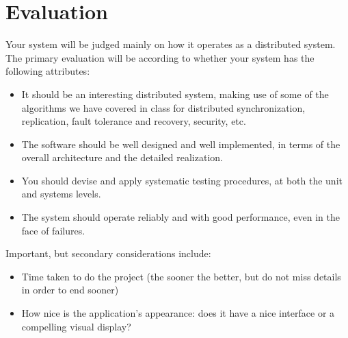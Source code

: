 \documentclass{memoir}
\begin{document}
\chapter*{Evaluation}
Your system will be judged mainly on how it operates as a distributed system. The primary evaluation will be according to whether your system has the following attributes:
\begin{itemize}
\item  It should be an interesting distributed system, making use of some of the algorithms we have covered in class for distributed synchronization, replication, fault tolerance and recovery, security, etc.
\item The software should be well designed and well implemented, in terms of the overall architecture and the detailed realization.
\item You should devise and apply systematic testing procedures, at both the unit and systems levels.
\item The system should operate reliably and with good performance, even in the face of failures.
\end{itemize}
Important, but secondary considerations include:
\begin{itemize}
\item Time taken to do the project (the sooner the better, but do not miss details in order to end sooner)
\item  How nice is the application's appearance: does it have a nice interface or a compelling visual display?
\end{itemize}
\end{document}
